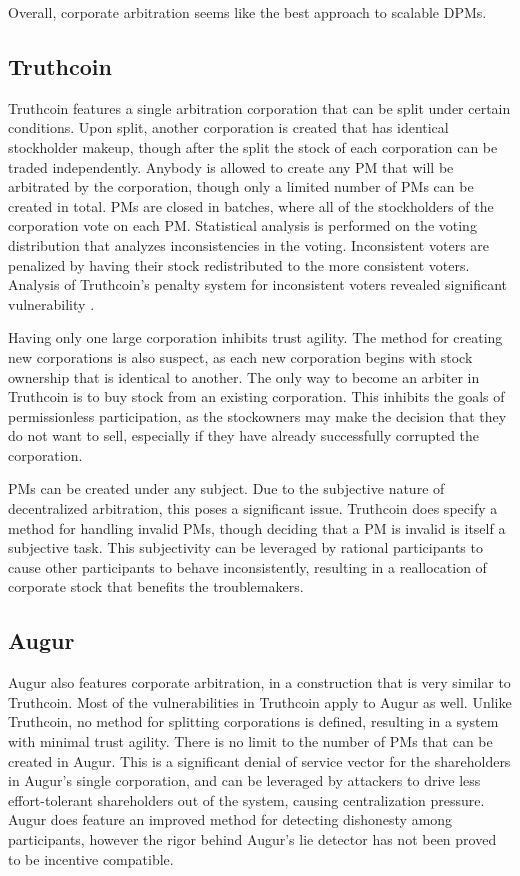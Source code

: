 \documentclass[onecolumn]{article}
\begin{document}
Overall, corporate arbitration seems like the best approach to scalable DPMs.

\subsection{Truthcoin}
Truthcoin \cite{truthcoin} features a single arbitration corporation that can be split under certain conditions.
Upon split, another corporation is created that has identical stockholder makeup, though after the split the stock of each corporation can be traded independently.
Anybody is allowed to create any PM that will be arbitrated by the corporation, though only a limited number of PMs can be created in total.
PMs are closed in batches, where all of the stockholders of the corporation vote on each PM.
Statistical analysis is performed on the voting distribution that analyzes inconsistencies in the voting.
Inconsistent voters are penalized by having their stock redistributed to the more consistent voters.
Analysis of Truthcoin's penalty system for inconsistent voters revealed significant vulnerability \cite{bbld}.

Having only one large corporation inhibits trust agility.
The method for creating new corporations is also suspect, as each new corporation begins with stock ownership that is identical to another.
The only way to become an arbiter in Truthcoin is to buy stock from an existing corporation.
This inhibits the goals of permissionless participation, as the stockowners may make the decision that they do not want to sell, especially if they have already successfully corrupted the corporation.

PMs can be created under any subject.
Due to the subjective nature of decentralized arbitration, this poses a significant issue.
Truthcoin does specify a method for handling invalid PMs, though deciding that a PM is invalid is itself a subjective task.
This subjectivity can be leveraged by rational participants to cause other participants to behave inconsistently, resulting in a reallocation of corporate stock that benefits the troublemakers.

\subsection{Augur}
Augur \cite{augur} also features corporate arbitration, in a construction that is very similar to Truthcoin.
Most of the vulnerabilities in Truthcoin apply to Augur as well.
Unlike Truthcoin, no method for splitting corporations is defined, resulting in a system with minimal trust agility.
There is no limit to the number of PMs that can be created in Augur.
This is a significant denial of service vector for the shareholders in Augur's single corporation, and can be leveraged by attackers to drive less effort-tolerant shareholders out of the system, causing centralization pressure.
Augur does feature an improved method for detecting dishonesty among participants, however the rigor behind Augur's lie detector has not been proved to be incentive compatible.
\end{document}
